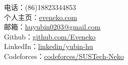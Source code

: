 \documentclass[10pt,a4paper]{article}
\begin{document}
\sloppy  %


\nobreakvspace{0.3em}  %


\begin{multicols}{2}
\noindent 电话：\textsmaller{+}(86)18823344853
\\
个人主页：\href{https://eveneko.com}{eveneko.com}
\\
邮箱：\noindent\href{mailto:huyubin0203@gmail.com}{huyubin0203\mbox{}@\mbox{}gmail.com}
\\
Github：\href{https://github.com/Eveneko}{github.com/Eveneko}
\\
LinkedIn：\href{https://www.linkedin.com/in/yubin-hu-7855861a0/}{linkedin/yubin-hu}
\\
Codeforces：\href{http://codeforces.com/profile/SUSTech-Neko}{codeforces/SUSTech-Neko}
\end{multicols}




\end{document}
